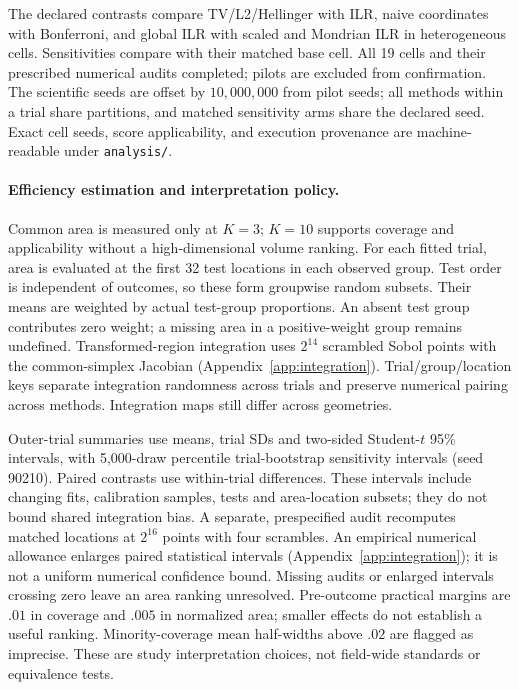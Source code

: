 The declared contrasts compare TV/L2/Hellinger with ILR, naive coordinates with Bonferroni, and global ILR with scaled and Mondrian ILR in heterogeneous cells. Sensitivities compare with their matched base cell. All 19 cells and their prescribed numerical audits completed; pilots are excluded from confirmation. The scientific seeds are offset by $10{,}000{,}000$ from pilot seeds; all methods within a trial share partitions, and matched sensitivity arms share the declared seed. Exact cell seeds, score applicability, and execution provenance are machine-readable under \texttt{analysis/}.

\paragraph{Efficiency estimation and interpretation policy.}
Common area is measured only at $K=3$; $K=10$ supports coverage and applicability without a high-dimensional volume ranking. For each fitted trial, area is evaluated at the first 32 test locations in each observed group. Test order is independent of outcomes, so these form groupwise random subsets. Their means are weighted by actual test-group proportions. An absent test group contributes zero weight; a missing area in a positive-weight group remains undefined. Transformed-region integration uses $2^{14}$ scrambled Sobol points with the common-simplex Jacobian (Appendix~\ref{app:integration}). Trial/group/location keys separate integration randomness across trials and preserve numerical pairing across methods. Integration maps still differ across geometries.

Outer-trial summaries use means, trial SDs and two-sided Student-$t$ 95\% intervals, with 5,000-draw percentile trial-bootstrap sensitivity intervals (seed 90210). Paired contrasts use within-trial differences. These intervals include changing fits, calibration samples, tests and area-location subsets; they do not bound shared integration bias. A separate, prespecified audit recomputes matched locations at $2^{16}$ points with four scrambles. An empirical numerical allowance enlarges paired statistical intervals (Appendix~\ref{app:integration}); it is not a uniform numerical confidence bound. Missing audits or enlarged intervals crossing zero leave an area ranking unresolved. Pre-outcome practical margins are $.01$ in coverage and $.005$ in normalized area; smaller effects do not establish a useful ranking. Minority-coverage mean half-widths above $.02$ are flagged as imprecise. These are study interpretation choices, not field-wide standards or equivalence tests.
